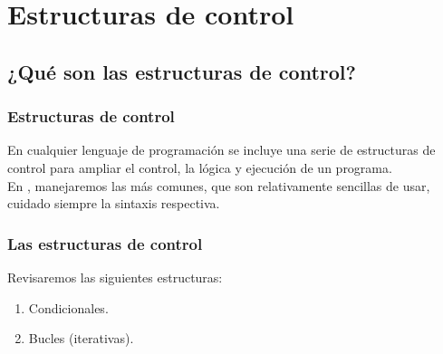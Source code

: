 \documentclass[12pt]{beamer}
\begin{document}

\section{Estructuras de control}
\subsection{¿Qué son las estructuras de control?}

\begin{frame}
\frametitle{Estructuras de control}
En cualquier lenguaje de programación se incluye una serie de estructuras de control para ampliar el control, la lógica y ejecución de un programa.
\\
\bigskip
En \python, manejaremos las más comunes, que son relativamente sencillas de usar, cuidado siempre la sintaxis respectiva.
\end{frame}
\begin{frame}
\frametitle{Las estructuras de control}
Revisaremos las siguientes estructuras:
\begin{enumerate}[<+->]
\item Condicionales.
\item  Bucles (iterativas).
\end{enumerate}
\end{frame}
\end{document}
